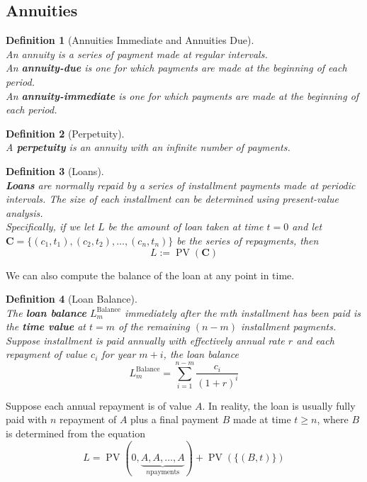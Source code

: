 \documentclass[12pt]{article}
\newtheorem{definition}{Definition}[section]
\theoremstyle{definition}
\DeclareMathOperator{\PV}{PV}
\newcommand\cf[1]{\mathbf{#1}}
\begin{document}
\subsection{Annuities}
\begin{definition}[Annuities Immediate and Annuities Due]
\hfill\\\normalfont An annuity is a series of payment made at regular intervals.\\
An \textbf{annuity-due} is one for which payments are made at the \textit{beginning} of each period.\\
An \textbf{annuity-immediate} is one for which payments are made at the \textit{beginning} of each period.
\end{definition}
\begin{definition}[Perpetuity]
\hfill\\\normalfont A \textbf{perpetuity} is an annuity with an infinite number of payments.
\end{definition}
\begin{definition}[Loans]
\hfill\\\normalfont \textbf{Loans} are normally repaid by a series of installment payments made at \textit{periodic} intervals. The size of each installment can be determined using present-value analysis.\\
Specifically, if we let $L$ be the amount of loan taken at time $t=0$ and let $\cf{C} =\{(c_1,t_1),(c_2,t_2),\ldots,(c_n,t_n)\}$ be the series of repayments, then
\[
L :=\PV(\cf{C})
\]
\end{definition}
We can also compute the balance of the loan at any point in time.\\
\begin{definition}[Loan Balance]
\hfill\\\normalfont
The \textbf{loan balance} $L_m^{\text{Balance}}$ immediately after the $m$th installment has been paid is the \textbf{time value} at $t = m$ of the remaining $(n-m)$ installment payments.\\
Suppose installment is paid annually with effectively annual rate $r$ and each repayment of value $c_i$ for year $m+i$, the loan balance
\[
L_m^\text{Balance} = \sum_{i = 1}^{n-m} \frac{c_i}{(1+r)^i}
\]
\end{definition}
Suppose each annual repayment is of value $A$. In reality, the loan is usually fully paid with $n$ repayment of $A$ plus a final payment $B$ made at time $t\geq n$, where $B$ is determined from the equation
\[
L=\PV(0,\underbrace{A,A,\ldots,A}_{n \text{payments}})+\PV(\{(B,t)\})
\]
\clearpage
\end{document}
